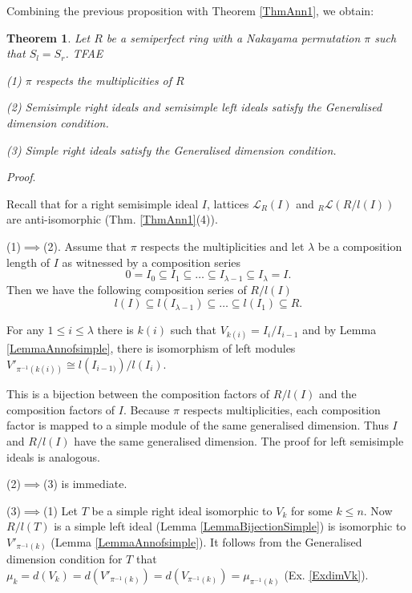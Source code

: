 \documentclass[11pt]{article}
\theoremstyle{plain}
\newtheorem{Thm}[veta]{Theorem}
\theoremstyle{remark}
\theoremstyle{plain}
\newenvironment{Proof}{
  \par\medskip\noindent
  \textit{Proof}.
}{
\newline
\rightline{$\qedsymbol$}
}
\begin{document}
Combining the previous proposition with Theorem \ref{ThmAnn1}, we obtain:
\begin{Thm}\label{ThmAnnMain}
    Let $R$ be a semiperfect ring with a Nakayama permutation $\pi$ such that $S_l=S_r$. TFAE

    (1) $\pi$ respects the multiplicities of $R$

    (2) Semisimple right ideals and semisimple left ideals satisfy the Generalised dimension condition.

    (3) Simple right ideals satisfy the Generalised dimension condition.
\end{Thm}
\begin{Proof}
Recall that for a right semisimple ideal $I$, lattices $\mathcal{L}_R(I)$ and $_R\mathcal{L}(R/l(I))$ are anti-isomorphic (Thm. \ref{ThmAnn1}(4)).

(1)$\implies$(2). Assume that $\pi$ respects the multiplicities and  let $\lambda$ be a composition length of $I$ as witnessed by a composition series
\[   0=I_0\subseteq I_1\subseteq \dots\subseteq  I_{\lambda-1}\subseteq I_\lambda=I.\]
Then we have the following composition series of $R/l(I)$   \[ l(I)\subseteq l(I_{\lambda-1})\subseteq \dots \subseteq l(I_1)\subseteq R.
    \] 
    
    For any $1\leq i\leq \lambda$ there is $k(i)$ such that $V_{k(i)}=I_i/I_{i-1}$ and by Lemma \ref{LemmaAnnofsimple}, there is isomorphism of left modules $V'_{\pi^{-1}(k(i))}\cong l(I_{i-1)})/l(I_i)$. 

    This is a bijection between the composition factors of $R/l(I)$ and the composition factors of $I$. Because $\pi$ respects multiplicities, each composition factor is mapped to a simple module of the same generalised dimension. Thus $I$ and  $R/l(I)$ have the same generalised dimension. The proof for left semisimple ideals is analogous.

(2)$\implies$(3) is immediate.

(3)$\implies$(1) Let $T$ be a simple right ideal isomorphic to $V_k$ for some $k\leq n$. Now $R/l(T)$ is a simple left ideal (Lemma \ref{LemmaBijectionSimple}) is isomorphic to $V'_{\pi^{-1}(k)}$ (Lemma \ref{LemmaAnnofsimple}). It follows from the Generalised dimension condition for $T$ that $\mu_k=d(V_k)=d(V'_{\pi^{-1}(k)})=d(V_{\pi^{-1}(k)})=\mu_{\pi^{-1}(k)}$ (Ex. \ref{ExdimVk}). 
    \end{Proof}
\end{document}
